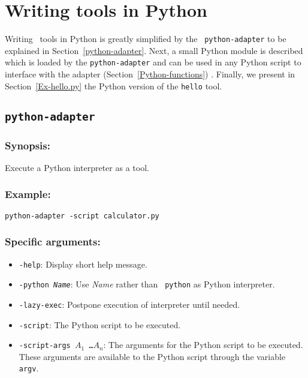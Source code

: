 
\section{\label{ToolsInPython}Writing tools in Python}

Writing \TB\ tools in Python is greatly simplified by the {\tt
python-adapter} to be explained in Section~\ref{python-adapter}.
Next, a small Python module is described which is loaded by the
\texttt{python-adapter} and can be used in any Python script
to interface with the adapter (Section~\ref{Python-functions}) .
Finally, we present in Section~\ref{Ex-hello.py} the Python
version of the \texttt{hello} tool.

\subsection{\label{python-adapter}\texttt{python-adapter}}

\subsubsection{Synopsis:} 

Execute a Python interpreter as a tool.

\subsubsection{Example:} 

\texttt{python-adapter -script calculator.py}

\subsubsection{Specific arguments:}

\begin{itemize}
\item \texttt{-help}: Display short help message.
\item \texttt{-python \emph{Name\/}}: Use \emph{Name} rather than {\tt
  python} as Python interpreter.
\item \texttt{-lazy-exec}: Postpone execution of interpreter until 
  needed.
\item \texttt{-script}: The Python script to be executed.
\item \texttt{-script-args $A_1$ \ldots $A_n$}: The arguments for
  the Python script to be executed. These arguments are available
  to the Python script through the variable \texttt{argv}.
\end{itemize}

